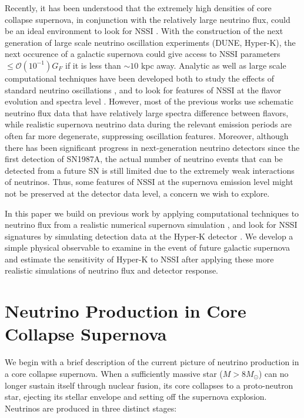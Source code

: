 \documentclass[a4paper,12pt]{article}
\begin{document}
Recently, it has been understood that the extremely high densities of core collapse supernova, in conjunction with the relatively large neutrino flux, could be an ideal environment to look for NSSI \cite{Raffelt:2013rqa,Blennow:2008er,Nakazato:2012qf,Dighe:2017sur,Duan:2006an,Duan:2008eb}. With the construction of the next generation of large scale neutrino oscillation experiments (DUNE, Hyper-K), the next occurence of a galactic supernova could give access to NSSI parameters $\leq\mathcal{O}(10^{-1})G_{F}$ if it is less than $\sim10$ kpc away. Analytic as well as large scale computational techniques have been developed both to study the effects of standard neutrino oscillations \cite{Duan:2006an,Duan:2008eb,Fogli:2004ff,Dighe:1999bi,Doring:2019axc,Shalgar:2019kzy}, and to look for features of NSSI at the flavor evolution and spectra level \cite{Dighe:2017sur,Kharlanov:2019cpk}. However, most of the previous works use schematic neutrino flux data that have relatively large spectra difference between flavors, while realistic supernova neutrino data during the relevant emission periods are often far more degenerate, suppressing oscillation features. Moreover, although there has been significant progress in next-generation neutrino detectors since the first detection of SN1987A, the actual number of neutrino events that can be detected from a future SN is still limited due to the extremely weak interactions of neutrinos. Thus, some features of NSSI at the supernova emission level might not be preserved at the detector data level, a concern we wish to explore. 
	
	In this paper we build on previous work by applying computational techniques to neutrino flux from a realistic numerical supernova simulation \cite{Nakazato:2012qf}, and look for NSSI signatures by simulating detection data at the Hyper-K detector \cite{Abe:2018uyc}. We develop a simple physical observable to examine in the event of future galactic supernova and estimate the sensitivity of Hyper-K to NSSI after applying these more realistic simulations of neutrino flux and detector response.

\section{Neutrino Production in Core Collapse Supernova}
We begin with a brief description of the current picture of neutrino production in a core collapse supernova. When a sufficiently massive star ($M > 8M_{\odot}$) can no longer sustain itself through nuclear fusion, its core collapses to a proto-neutron star, ejecting its stellar envelope and setting off the supernova explosion. Neutrinos are produced in three distinct stages:
\end{document}
